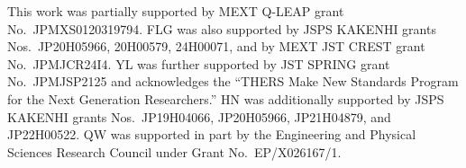 \documentclass[10pt,a4paper]{article}
\numberwithin{equation}{section}
\numberwithin{figure}{section}
\begin{document}
This work was partially supported by MEXT Q-LEAP grant No.~\mbox{JPMXS0120319794}. 
FLG was also supported by JSPS KAKENHI grants Nos.~\mbox{JP20H05966}, \mbox{20H00579}, \mbox{24H00071}, and by MEXT JST CREST grant No.~\mbox{JPMJCR24I4}. 
YL was further supported by JST SPRING grant No.~\mbox{JPMJSP2125} and acknowledges the ``THERS Make New Standards Program for the Next Generation Researchers.''
HN was additionally supported by JSPS KAKENHI grants Nos.~\mbox{JP19H04066}, \mbox{JP20H05966}, \mbox{JP21H04879}, and \mbox{JP22H00522}.
QW was supported in part by the Engineering and Physical Sciences Research Council under Grant No.~\mbox{EP/X026167/1}. 



\newcommand{\etalchar}[1]{$^{#1}$}
\DeclareRobustCommand{\dutchPrefix}[2]{#2}\providecommand{\dutchPrefix}[2]{#2}\renewcommand{\dutchPrefix}[2]{#2}\newcommand{\prelimVersion}[2]{Preliminary version in \textit{\MakeUppercase{#1} #2}}
\end{document}
